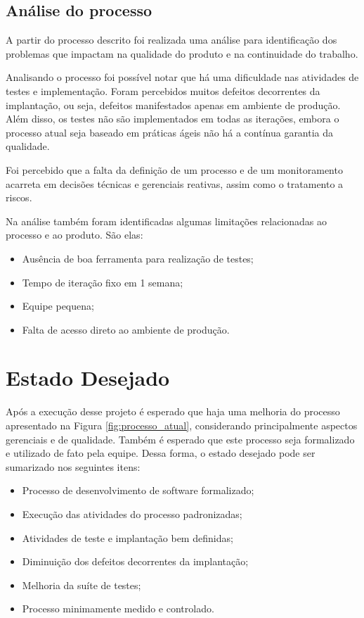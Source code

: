 \subsection{Análise do processo}

A partir do processo descrito foi realizada uma análise para identificação dos problemas que impactam na qualidade do produto 
e na continuidade do trabalho. 

Analisando o processo foi possível notar que há uma dificuldade nas atividades de testes e implementação. Foram percebidos
muitos defeitos decorrentes da implantação, ou seja, defeitos manifestados apenas em ambiente de produção. Além disso, 
os testes não são implementados em todas as iterações, embora o processo atual seja baseado em práticas ágeis não há a 
contínua garantia da qualidade.

Foi percebido que a falta da definição de um processo e de um monitoramento acarreta em 
decisões técnicas e gerenciais reativas, assim como o tratamento a riscos. 

Na análise também foram identificadas algumas limitações relacionadas ao processo e ao produto. São elas: 

\begin{itemize}
  \item Ausência de boa ferramenta para realização de testes;
  \item Tempo de iteração fixo em 1 semana;
  \item Equipe pequena;
  \item Falta de acesso direto ao ambiente de produção.
\end{itemize}

\section{Estado Desejado}

Após a execução desse projeto é esperado que haja uma melhoria do processo apresentado na Figura \ref{fig:processo_atual}, 
considerando principalmente aspectos gerenciais e de qualidade. Também é esperado que este processo seja formalizado e utilizado
de fato pela equipe. Dessa forma, o estado desejado pode ser sumarizado nos seguintes itens:

\begin{itemize}
	\item Processo de desenvolvimento de software formalizado;
	\item Execução das atividades do processo padronizadas;
	\item Atividades de teste e implantação bem definidas;
	\item Diminuição dos defeitos decorrentes da implantação;
	\item Melhoria da suíte de testes;
	\item Processo minimamente medido e controlado.

\end{itemize}

